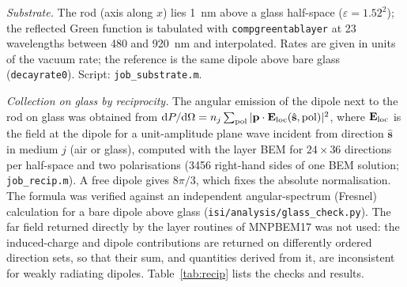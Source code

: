 \documentclass[11pt,a4paper]{article}
\begin{document}
\emph{Substrate.} The rod (axis along $x$) lies \SI{1}{nm} above a glass half-space ($\varepsilon=1.52^2$); the
reflected Green function is tabulated with \texttt{compgreentablayer} at 23 wavelengths between 480 and \SI{920}{nm}
and interpolated. Rates are given in units of the vacuum rate; the reference is the same dipole above bare glass
(\texttt{decayrate0}). Script: \texttt{job\_substrate.m}.

\emph{Collection on glass by reciprocity.} The angular emission of the dipole next to the rod on glass was obtained
from $\mathrm{d}P/\mathrm{d}\Omega=n_j\sum_{\rm pol}|\mathbf p\cdot\mathbf E_{\rm loc}(\hat{\mathbf s},{\rm pol})|^2$,
where $\mathbf E_{\rm loc}$ is the field at the dipole for a unit-amplitude plane wave incident from direction
$\hat{\mathbf s}$ in medium $j$ (air or glass), computed with the layer BEM for $24\times36$ directions per half-space
and two polarisations (3456 right-hand sides of one BEM solution; \texttt{job\_recip.m}). A free dipole gives
$8\pi/3$, which fixes the absolute normalisation. The formula was verified against an independent angular-spectrum
(Fresnel) calculation for a bare dipole above glass (\texttt{isi/analysis/glass\_check.py}). The far field returned
directly by the layer routines of MNPBEM17 was not used: the induced-charge and dipole contributions are returned on
differently ordered direction sets, so that their sum, and quantities derived from it, are inconsistent for weakly
radiating dipoles. Table~\ref{tab:recip} lists the checks and results.
\end{document}
